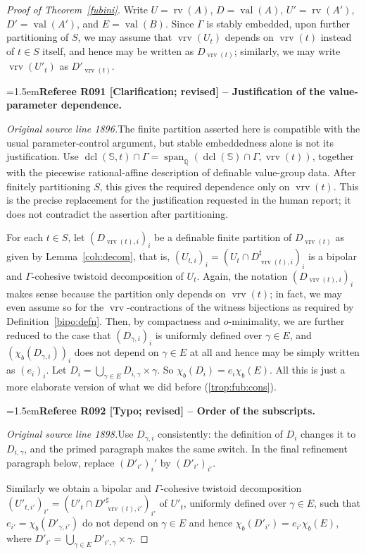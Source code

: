 \documentclass[12pt]{amsart}
\newcommand{\RefereeRemark}[4]{%
  \par\medskip\begingroup\normalfont\small\color{RefereePurple}%
  \emergencystretch=1.5em\noindent\textbf{Referee R#1 [#2] -- #3.}\par\nobreak\noindent #4\par
  \endgroup\medskip
}
\theoremstyle{plain}
\theoremstyle{definition}
\theoremstyle{remark}
\numberwithin{equation}{section}
\theoremstyle{plain}
\DeclareMathOperator{\dcl}{dcl}
\newcommand{\omin}{$o$\nobreakdash}
\newcommand{\0}{\emptyset}
\DeclareMathOperator{\rv}{rv}
\DeclareMathOperator{\vv}{val}
\DeclareMathOperator{\vrv}{vrv}
\begin{document}
\begin{proof}[Proof of Theorem~\ref{fubini}]
Write $U = \rv(A)$, $D = \vv(A)$, $U '= \rv(A')$, $D' = \vv(A')$, and $E = \vv(B)$. Since  $\Gamma$ is stably embedded, upon further partitioning of $S$, we may assume that $\vrv(U_{t})$ depends on $\vrv(t)$ instead of $t \in S$ itself, and hence may be written as $D_{\vrv(t)}$; similarly, we may write $\vrv(U'_{t})$ as $D'_{\vrv(t)}$.

\RefereeRemark{091}{Clarification; revised}{Justification of the value-parameter dependence}{%
\textit{Original source line 1896.}\quad The finite partition asserted here is compatible with the usual parameter-control argument, but stable embeddedness alone is not its justification. Use $\dcl(\mathbb S,t)\cap\Gamma=\operatorname{span}_{\mathbb Q}(\dcl(\mathbb S)\cap\Gamma,\vrv(t))$, together with the piecewise rational-affine description of definable value-group data. After finitely partitioning $S$, this gives the required dependence only on $\vrv(t)$. This is the precise replacement for the justification requested in the human report; it does not contradict the assertion after partitioning.
}

For each $t \in S$, let $(D_{\vrv(t),i})_i$ be a definable finite partition of $D_{\vrv(t)}$ as given by Lemma~\ref{coh:decom}, that is, $(U_{t,i})_i = (U_t \cap D_{\vrv(t),i}^\sharp)_i$ is a bipolar and $\Gamma$-cohesive twistoid decomposition of $U_t$. Again, the notation  $(D_{\vrv(t),i})_i$ makes sense because the partition only depends on $\vrv(t)$; in fact, we may even assume so  for the $\vrv$-contractions of the witness bijections as required by Definition~\ref{bipo:defn}. Then, by compactness and \omin-minimality, we are further reduced to the case that $(D_{\gamma,i})_i$ is uniformly defined over $\gamma \in E$, and $(\chi_b (D_{\gamma,i}))_i$ does not depend on $\gamma \in E$ at all and hence may be simply written as $(e_i)_i$. Let $D_i = \bigcup_{\gamma \in E} D_{i,\gamma} \times \gamma$. So $\chi_b(D_i) = e_i \chi_b(E)$. All this is just a more elaborate version of what we did before (\ref{trop:fub:cons}).

\RefereeRemark{092}{Typo; revised}{Order of the subscripts}{%
\textit{Original source line 1898.}\quad Use $D_{\gamma,i}$ consistently: the definition of $D_i$ changes it to $D_{i,\gamma}$, and the primed paragraph makes the same switch. In the final refinement paragraph below, replace $(D'_{i'})_i'$ by $(D'_{i'})_{i'}$.
}

Similarly we obtain a bipolar and $\Gamma$-cohesive twistoid decomposition $(U'_{t,i'})_{i'} = (U'_t \cap {D'}_{\vrv(t),i'}^\sharp)_{i'}$ of $U'_t$, uniformly defined over $\gamma\in E$, such that $e_{i'}=\chi_b (D'_{\gamma,i'})$ do not depend on $\gamma \in E$ and hence $\chi_b(D'_{i'}) = e_{i'} \chi_b(E)$, where $D'_{i'}=\bigcup_{\gamma \in E} D'_{i',\gamma} \times \gamma$.


\end{proof}
\end{document}

